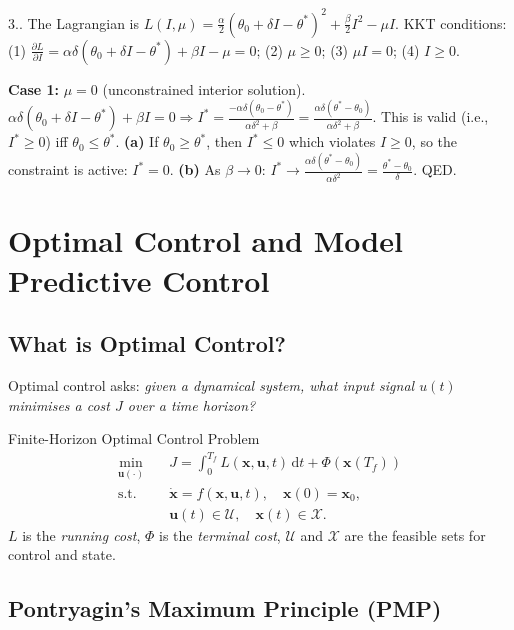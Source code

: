\documentclass[12pt,a4paper,openany]{book}
\newcounter{exoctr}[chapter]
\renewcommand{\theexoctr}{\thechapter.\arabic{exoctr}}
\newcommand{\bx}{\bm{x}}
\newcommand{\bu}{\bm{u}}
\newcommand{\dt}{\,\mathrm{d}t}
\begin{document}
\begin{solbox}{3.\theexoctr}
The Lagrangian is $L(I,\mu)=\frac{\alpha}{2}(\theta_0+\delta I-\theta^*)^2+\frac{\beta}{2}I^2-\mu I$.
KKT conditions: (1) $\frac{\partial L}{\partial I}=\alpha\delta(\theta_0+\delta I-\theta^*)+\beta I-\mu=0$; (2) $\mu\geq0$; (3) $\mu I=0$; (4) $I\geq0$.

\textbf{Case 1:} $\mu=0$ (unconstrained interior solution).
$\alpha\delta(\theta_0+\delta I-\theta^*)+\beta I=0 \Rightarrow I^*=\frac{-\alpha\delta(\theta_0-\theta^*)}{\alpha\delta^2+\beta}=\frac{\alpha\delta(\theta^*-\theta_0)}{\alpha\delta^2+\beta}$.
This is valid (i.e., $I^*\geq0$) iff $\theta_0\leq\theta^*$. \textbf{(a)} If $\theta_0\geq\theta^*$, then $I^*\leq0$ which violates $I\geq0$, so the constraint is active: $I^*=0$. \textbf{(b)} As $\beta\to0$: $I^*\to\frac{\alpha\delta(\theta^*-\theta_0)}{\alpha\delta^2}=\frac{\theta^*-\theta_0}{\delta}$. QED.
\end{solbox}

\chapter{Optimal Control and Model Predictive Control}
\label{chap:ocp}

\section{What is Optimal Control?}

Optimal control asks: \textit{given a dynamical system, what input signal $u(t)$ minimises a cost $J$ over a time horizon?}

\begin{defbox}{Finite-Horizon Optimal Control Problem}
\begin{align}
\min_{\bu(\cdot)}\quad& J = \int_0^{T_f}\!L(\bx,\bu,t)\dt + \Phi(\bx(T_f))\\
\text{s.t.}\quad& \dot{\bx}=f(\bx,\bu,t),\quad \bx(0)=\bx_0,\\
& \bu(t)\in\mathcal{U},\quad \bx(t)\in\mathcal{X}.
\end{align}
$L$ is the \emph{running cost}, $\Phi$ is the \emph{terminal cost}, $\mathcal{U}$ and $\mathcal{X}$ are the feasible sets for control and state.
\end{defbox}

\section{Pontryagin's Maximum Principle (PMP)}
\end{document}
